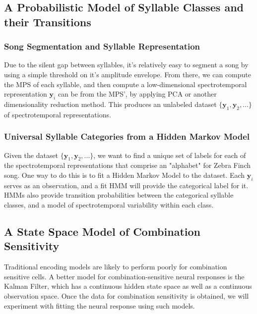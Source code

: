 \documentclass[12pt,article,oneside]{memoir}
\begin{document}
\subsection{A Probabilistic Model of Syllable Classes and their Transitions}

\subsubsection{Song Segmentation and Syllable Representation}

Due to the silent gap between syllables, it's relatively easy to segment a song by using
a simple threshold on it's amplitude envelope. From there, we can compute the MPS of each
syllable, and then compute a low-dimensional spectrotemporal representation $\bm{y}_i$ can
be from the MPS', by applying PCA or another dimensionality reduction method. This produces
an unlabeled dataset $\{ \bm{y}_1, \bm{y}_2, ... \}$ of spectrotemporal representations.

\subsubsection{Universal Syllable Categories from a Hidden Markov Model}

Given the dataset $\{ \bm{y}_1, \bm{y}_2, ... \}$, we want to find a unique set of labels
for each of the spectrotemporal representations that comprise an "alphabet" for Zebra Finch
song. One way to do this is to fit a Hidden Markov Model to the dataset. Each $\bm{y}_i$
serves as an observation, and a fit HMM will provide the categorical label for it. HMMs
also provide transition probabilities between the categorical syllable classes, and a model
of spectrotemporal variability within each class.

\subsection{A State Space Model of Combination Sensitivity}

Traditional encoding models are likely to perform poorly for combination sensitive cells. A
better model for combination-sensitive neural responses is the Kalman Filter, which has
a continuous hidden state space as well as a continuous observation space. Once the data
for combination sensitivity is obtained, we will experiment with fitting the neural response
using such models.


\printbibliography
\end{document}

